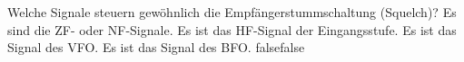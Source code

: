     {Welche Signale steuern gewöhnlich die Empfängerstummschaltung (Squelch)?}
    {Es sind die ZF- oder NF-Signale.}
    {Es ist das HF-Signal der Eingangsstufe.}
    {Es ist das Signal des VFO.}
    {Es ist das Signal des BFO.}
    {false}{false}